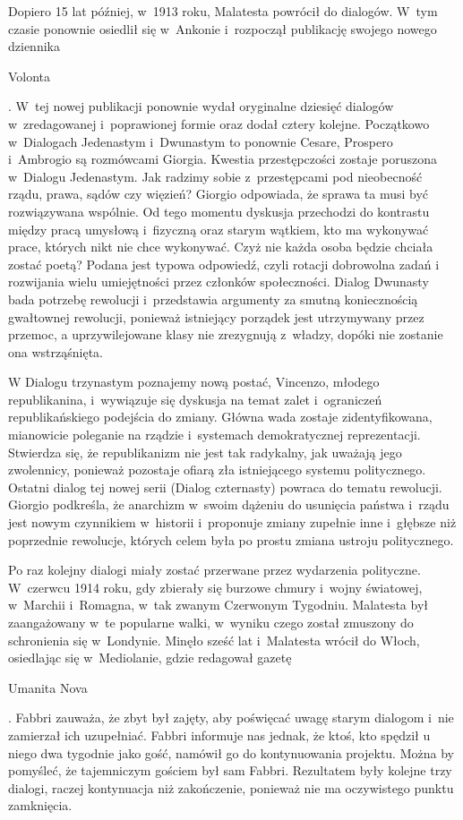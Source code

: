\documentclass[oneside,polish,11pt,sfheadings]{mwbk}
\begin{document}
 
Dopiero 15 lat później, w~1913 roku, Malatesta powrócił do dialogów. W~tym czasie ponownie osiedlił się w~Ankonie i~rozpoczął publikację swojego nowego dziennika \begin{itshape}Volonta \end{itshape}. W~tej
nowej publikacji ponownie wydał oryginalne dziesięć dialogów w~zredagowanej i~poprawionej formie oraz dodał cztery
kolejne. Początkowo w~Dialogach Jedenastym i~Dwunastym to ponownie Cesare, Prospero i~Ambrogio są rozmówcami Giorgia.
Kwestia przestępczości zostaje poruszona w~Dialogu Jedenastym. Jak radzimy sobie z~przestępcami pod nieobecność rządu,
prawa, sądów czy więzień? Giorgio odpowiada, że sprawa ta musi być rozwiązywana wspólnie. Od tego momentu dyskusja
przechodzi do kontrastu między pracą umysłową i~fizyczną oraz starym wątkiem, kto ma wykonywać prace, których nikt nie
chce wykonywać. Czyż nie każda osoba  będzie chciała zostać poetą? Podana jest typowa odpowiedź, czyli rotacji  dobrowolna zadań
i rozwijania wielu umiejętności przez członków społeczności. Dialog Dwunasty bada potrzebę rewolucji i~przedstawia
argumenty za smutną koniecznością gwałtownej rewolucji, ponieważ istniejący porządek jest utrzymywany przez przemoc, a
uprzywilejowane klasy nie zrezygnują z~władzy, dopóki nie zostanie ona wstrząśnięta. 

 
W Dialogu trzynastym poznajemy nową postać, Vincenzo, młodego republikanina, i~wywiązuje się dyskusja na temat zalet i~ograniczeń republikańskiego podejścia do zmiany. Główna wada zostaje zidentyfikowana, mianowicie poleganie na rządzie i~systemach demokratycznej reprezentacji. Stwierdza się, że republikanizm nie jest tak radykalny, jak uważają jego
zwolennicy, ponieważ pozostaje ofiarą zła istniejącego systemu politycznego. Ostatni dialog tej nowej serii (Dialog
czternasty) powraca do tematu rewolucji. Giorgio podkreśla, że anarchizm w~swoim dążeniu do usunięcia państwa i~rządu
jest nowym czynnikiem w~historii i~proponuje zmiany zupełnie inne i~głębsze niż poprzednie rewolucje, których celem
była po prostu zmiana ustroju politycznego. 

 
Po raz kolejny dialogi miały zostać przerwane przez wydarzenia polityczne. W~czerwcu 1914 roku, gdy zbierały się burzowe
chmury i~wojny światowej, w~Marchii i~Romagna, w~tak zwanym Czerwonym Tygodniu. Malatesta był zaangażowany w~te
popularne walki, w~wyniku czego został zmuszony do schronienia się w~Londynie. Minęło sześć lat i~Malatesta wrócił do
Włoch, osiedlając się w~Mediolanie, gdzie redagował gazetę \begin{itshape}Umanita
Nova \end{itshape}. Fabbri zauważa, że zbyt był zajęty, aby poświęcać uwagę starym dialogom i~nie
zamierzał ich uzupełniać. Fabbri informuje nas jednak, że ktoś, kto spędził u niego dwa tygodnie jako gość, namówił go
do kontynuowania projektu. Można by pomyśleć, że tajemniczym gościem był sam Fabbri. Rezultatem były kolejne trzy
dialogi, raczej kontynuacja niż zakończenie, ponieważ nie ma oczywistego punktu zamknięcia. 
\end{document}

